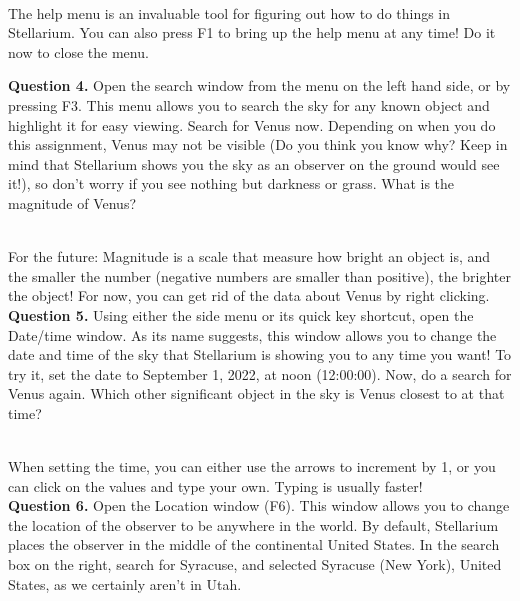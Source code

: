 \documentclass[11pt]{article}
\begin{document}
\hrulefill\\

The help menu is an invaluable tool for figuring out how to do things in Stellarium. You can also press F1 to bring up the help menu at any time! Do it now to close the menu.

\newpage

\textbf{Question 4.} Open the search window from the menu on the left hand side, or by pressing F3. This menu allows you to search the sky for any known object and highlight it for easy viewing. Search for Venus now. Depending on when you do this assignment, Venus may not be visible (Do you think you know why? Keep in mind that Stellarium shows you the sky as an observer on the ground would see it!), so don't worry if you see nothing but darkness or grass. What is the magnitude of Venus?\\
\vspace*{1.5cm}

\hrulefill\\
For the future: Magnitude is a scale that measure how bright an object is, and the smaller the number (negative numbers are smaller than positive), the brighter the object! For now, you can get rid of the data about Venus by right clicking.\\

\textbf{Question 5.} Using either the side menu or its quick key shortcut, open the Date/time window. As its name suggests, this window allows you to change the date and time of the sky that Stellarium is showing you to any time you want! To try it, set the date to September 1, 2022, at noon (12:00:00). Now, do a search for Venus again. Which other significant object in the sky is Venus closest to at that time?\\
\vspace*{1.5cm}

\hrulefill\\
When setting the time, you can either use the arrows to increment by 1, or you can click on the values and type your own. Typing is usually faster!\\

\textbf{Question 6.} Open the Location window (F6). This window allows you to change the location of the observer to be anywhere in the world. By default, Stellarium places the observer in the middle of the continental United States. In the search box on the right, search for Syracuse, and selected Syracuse (New York), United States, as we certainly aren't in Utah.\\
\end{document}
